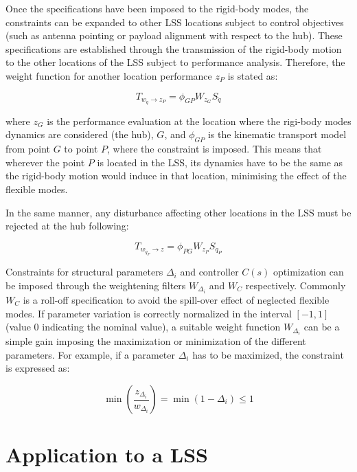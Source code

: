 \documentclass{ifacconf}
\begin{document}
Once the specifications have been imposed to the rigid-body modes, the constraints can be expanded to other LSS locations subject to control objectives (such as antenna pointing or payload alignment with respect to the hub). These specifications are established through the transmission of the rigid-body motion to the other locations of the LSS subject to performance analysis. Therefore, the weight function for another location performance $z_P$ is stated as:

\begin{equation}
\label{eq:hub2tip}
T_{w_{\ddot{q}}\rightarrow z_P} = \phi_{GP} W_{z_G} S_{\ddot{q}} 
\end{equation}

where $z_G$ is the performance evaluation at the location where the rigi-body modes dynamics are considered (the hub), $G$, and $\phi_{GP}$ is the kinematic transport model from point $G$ to point $P$, where the constraint is imposed. This means that wherever the point $P$ is located in the LSS, its dynamics have to be the same as the rigid-body motion would induce in that location, minimising the effect of the flexible modes.

In the same manner, any disturbance affecting other locations in the LSS must be rejected at the hub following:

\begin{equation}
\label{eq:tip2hub}
T_{w_{\ddot{q}_P}\rightarrow z} = \phi_{PG} W_{z_P} S_{\ddot{q}_P} 
\end{equation}



Constraints for structural parameters $\Delta_i$ and controller $C(s)$ optimization can be imposed through the weightening filters $W_{\Delta_i}$ and $W_{C}$ respectively. Commonly $W_{C}$ is a roll-off specification to avoid the spill-over effect of neglected flexible modes. If parameter variation is correctly normalized in the interval $[-1,1]$ (value $0$ indicating the nominal value), a suitable weight function $W_{\Delta_i}$ can be a simple gain imposing the maximization or minimization of the different parameters. For example, if a parameter $\Delta_i$ has to be maximized, the constraint is expressed as:

\begin{equation}
\label{eq:parameter}
\min(\frac{z_{\Delta_i}}{w_{\Delta_i}})=\min(1-\Delta_i) \leq 1
\end{equation}


\section{Application to a LSS}
\end{document}
